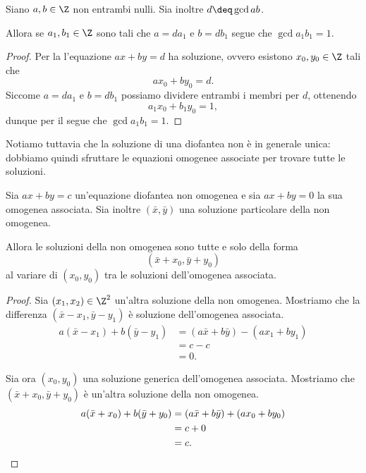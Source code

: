 \begin{corollary}
    Siano $a, b \in \Z$ non entrambi nulli. Sia inoltre $d \deq \gcd{a}{b}$.

    Allora se $a_1, b_1 \in \Z$ sono tali che $a = da_1$ e $b = db_1$ segue che $\gcd{a_1}{b_1} = 1$.
\end{corollary}
\begin{proof}
    Per la  l'equazione $ax + by = d$ ha soluzione, ovvero esistono $x_0, y_0 \in \Z$ tali che \[
        ax_0 + by_0 = d.
    \] Siccome $a = da_1$ e $b = db_1$ possiamo dividere entrambi i membri per $d$, ottenendo \[
        a_1x_0 + b_1y_0 = 1,    
    \] dunque per il  segue che $\gcd{a_1}{b_1} = 1$.
\end{proof}

Notiamo tuttavia che la soluzione di una diofantea non è in generale unica: dobbiamo quindi sfruttare le equazioni omogenee associate per trovare tutte le soluzioni.

\begin{proposition}
    Sia $ax + by = c$ un'equazione diofantea non omogenea e sia $ax + by = 0$ la sua omogenea associata.
    Sia inoltre $(\bar x, \bar y)$ una soluzione particolare della non omogenea. 
    
    Allora le soluzioni della non omogenea sono tutte e solo della forma \begin{equation}
        (\bar x + x_0, \bar y + y_0)
    \end{equation} al variare di $(x_0, y_0)$ tra le soluzioni dell'omogenea associata.
\end{proposition}
\begin{proof}
    Sia $(x_1, x_2) \in \Z^2$ un'altra soluzione della non omogenea. Mostriamo che la differenza $(\bar x - x_1, \bar y - y_1)$ è soluzione dell'omogenea associata.
    \begin{align*}
        a(\bar x - x_1) + b(\bar y - y_1) &= (a\bar x + b\bar y) - (ax_1 + by_1) \\
        &= c - c \\
        &= 0.
    \end{align*}

    Sia ora $(x_0, y_0)$ una soluzione generica dell'omogenea associata. Mostriamo che $(\bar x + x_0, \bar y + y_0)$ è un'altra soluzione della non omogenea.
    \begin{align*}
        a(\bar x + x_0) + b(\bar y + y_0) &= (a\bar x + b\bar y) + (ax_0 + by_0) \\
        &= c + 0 \\
        &= c. \qedhere
    \end{align*}
\end{proof}

